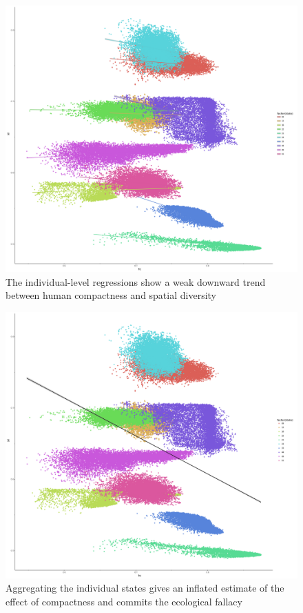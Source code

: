 \documentclass[]{article}
\begin{document}
\begin{figure}
\centering
\includegraphics{../30_results/individual_regressions.png}
\caption{The individual-level regressions show a weak downward trend
between human compactness and spatial diversity\label{indiv_reg}}
\end{figure}

\begin{figure}
\centering
\includegraphics{../30_results/grouped_regressions.png}
\caption{Aggregating the individual states gives an inflated estimate of
the effect of compactness and commits the ecological fallacy
\label{grouped_reg}}
\end{figure}
\end{document}
